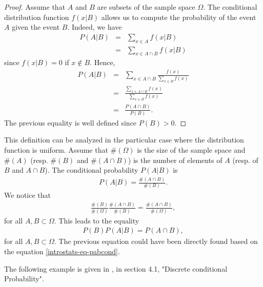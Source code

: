 \begin{proof}
Assume that $A$ and $B$ are subsets of the sample space $\Omega$.
The conditional distribution function $f(x|B)$ allows 
us to compute the probability of the event $A$ given the event $B$.
Indeed, we have
\begin{eqnarray}
P(A|B) 
&=& \sum_{x\in A} f(x|B)\\
&=& \sum_{x\in A\cap B} f(x|B)
\end{eqnarray}
since $f(x|B)= 0$ if $x\notin B$.
Hence,
\begin{eqnarray}
P(A|B) &=& \sum_{x\in A\cap B} \frac{f(x)}{\sum_{x\in B} f(x)} \\
&=&  \frac{\sum_{x\in A\cap B} f(x)}{\sum_{x\in B} f(x)} \\
&=&  \frac{P(A\cap B)}{P(B)}.
\end{eqnarray}
The previous equality is well defined since $P(B)>0$.
\end{proof}

This definition can be analyzed in the particular case 
where the distribution function is uniform. 
Assume that $\#(\Omega)$ is the size of the sample space and $\#(A)$ (resp. $\#(B)$ and 
$\#(A\cap B)$) is the number of elements of $A$ (resp. of $B$ and 
$A\cap B$). The conditional probability $P(A|B)$ is 
\begin{eqnarray}
P(A|B) = \frac{\#(A\cap B)}{\#(B)}.
\end{eqnarray}
We notice that
\begin{eqnarray}
\frac{\#(B)}{\#(\Omega)} \frac{\#(A\cap B)}{\#(B)} = \frac{\#(A\cap B)}{\#(\Omega)},
\end{eqnarray}
for all $A,B\subset \Omega$. This leads to the equality 
\begin{eqnarray}
P(B) P(A|B) = P(A\cap B),
\end{eqnarray}
for all $A,B\subset \Omega$. The previous equation could have been directly found based on the 
equation \ref{introstats-eq-pabcond}.

The following example is given in \cite{introprobasGrinsteadSnell},
in section 4.1, "Discrete conditional Probability".

